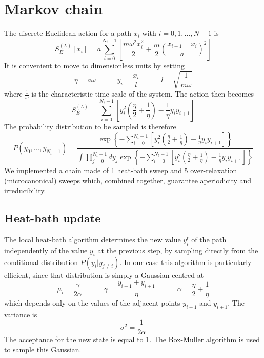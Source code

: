 \documentclass[10pt,a4paper]{article}
\begin{document}
\section{Markov chain}
The discrete Euclidean action for a path $x_i$ with $i=0,1,\dots,N-1$ is
\begin{equation}
    S_E^{(L)}[x_i] = a \sum_{i=0}^{N_t-1} \left[ \frac{m\omega^2 x_i^2}{2} + \frac{m}{2} \left(\frac{x_{i+1}-x_i}{a}\right)^2 \right]
\end{equation}
It is convenient to move to dimensionless units by setting
\begin{equation}
    \eta = a \omega \quad\quad\quad y_i = \frac{x_i}{l} \quad\quad\quad l = \sqrt{\frac{1}{m\omega}}
\end{equation}
where $\frac{1}{\omega}$ is the characteristic time scale of the system. The action
then becomes
\begin{equation}
    S_E^{(L)} = \sum_{i=0}^{N_t-1} \left[ y_i^2 \left( \frac{\eta}{2} + \frac{1}{\eta}\right) - \frac{1}{\eta} y_i y_{i+1}\right]
\end{equation}
The probability distribution to be sampled is therefore
\begin{equation}
    P(y_0,\dots,y_{N_t-1}) = \frac{\exp\left\{ - \sum_{i=0}^{N_t-1} \left[y_i^2 \left(\frac{\eta}{2} + \frac{1}{\eta}\right) - \frac{1}{\eta} y_i y_{i+1}\right]\right\}}{\int \prod_{j=0}^{N_t-1} dy_j \exp\left\{ - \sum_{i=0}^{N_t-1} \left[y_i^2 \left(\frac{\eta}{2} + \frac{1}{\eta}\right) - \frac{1}{\eta} y_i y_{i+1}\right]\right\}}
\end{equation}
We implemented a chain made of 1 heat-bath sweep and 5 over-relaxation
(microcanonical) sweeps which, combined together, guarantee aperiodicity and
irreducibility.

\subsection{Heat-bath update}
The local heat-bath algorithm determines the new value $y_i^{t}$ of the path
independently of the value $y_i$ at the previous step, by sampling directly from
the conditional distribution $P(y_i | y_{j \neq i})$. In our case this algorithm is
particularly efficient, since that distribution is simply a Gaussian centred at
\begin{equation}
    \mu_i = \frac{\gamma}{2\alpha} \quad\quad\quad \gamma = \frac{y_{i-1} + y_{i+1}}{\eta} \quad\quad\quad \alpha = \frac{\eta}{2} + \frac{1}{\eta}
    \label{eq:hb_params}
\end{equation}
which depends only on the values of the adjacent points $y_{i-1}$ and $y_{i+1}$.
The variance is
\begin{equation}
    \sigma^2 = \frac{1}{2\alpha}
\end{equation}
The acceptance for the new state is equal to 1. The Box-Muller algorithm is used to
sample this Gaussian.
\end{document}
